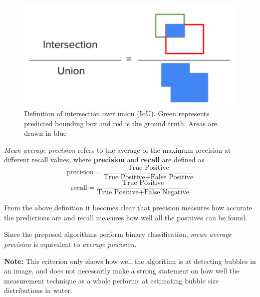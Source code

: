 		\begin{figure}
			\centering
			\includegraphics[scale=.5]{images/iou_def.png}
			\caption{Definition of intersection over union (IoU). Green represents predicted bounding box and red is the ground truth. Areas are drawn in blue}
			\label{fig:iou_def}
		\end{figure}				  
		  
		  \textit{Mean average precision} refers to the average of the maximum precision at different recall values, where \textbf{precision} and \textbf{recall} are defined as
		  \begin{equation}
		  	\text{precision} = \dfrac{\text{True Positive}}{ \text{True Positive} + \text{False Positive}}
		  \end{equation}
		  \begin{equation}
		  	\text{recall} = \dfrac{\text{True Positive}}{ \text{True Positive} + \text{False Negative}}
		  \end{equation}

		From the above definition it becomes clear that precision measures how accurate the predictions are and recall measures how well all the positives can be found.
		
		Since the proposed algorithms perform binary classification, \textit{mean average precision} is equivalent to \textit{average precision}. 
		
		\textbf{Note:} This criterion only shows how well the algorithm is at detecting bubbles in an image, and does not necessarily make a strong statement on how well the measurement technique as a whole performs at estimating bubble size distributions in water. 
		
		 



































